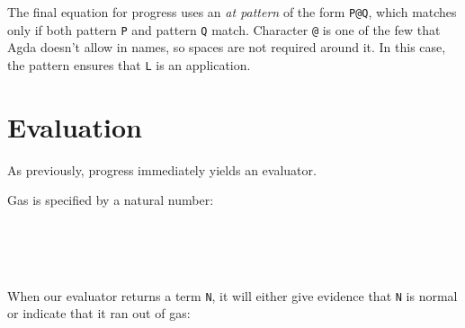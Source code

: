 The final equation for progress uses an \emph{at pattern} of the form
\texttt{P@Q}, which matches only if both pattern \texttt{P} and pattern
\texttt{Q} match. Character \texttt{@} is one of the few that Agda
doesn't allow in names, so spaces are not required around it. In this
case, the pattern ensures that \texttt{L} is an application.

\hypertarget{evaluation}{%
\section{Evaluation}\label{evaluation}}

As previously, progress immediately yields an evaluator.

Gas is specified by a natural number:

\begin{fence}
\begin{code}%
\>[0]\AgdaSpace{}%
\AgdaSpace{}%
\AgdaSymbol{:}\AgdaSpace{}%
\AgdaSpace{}%
\<%
\\
\>[0][@{}l@{\AgdaIndent{0}}]%
\>[2]\AgdaSpace{}%
\<%
\\
%
\>[2]\<%
\\
\>[2][@{}l@{\AgdaIndent{0}}]%
\>[4]\AgdaSpace{}%
\AgdaSymbol{:}\AgdaSpace{}%
\<%
\end{code}
\end{fence}

When our evaluator returns a term \texttt{N}, it will either give
evidence that \texttt{N} is normal or indicate that it ran out of gas:

